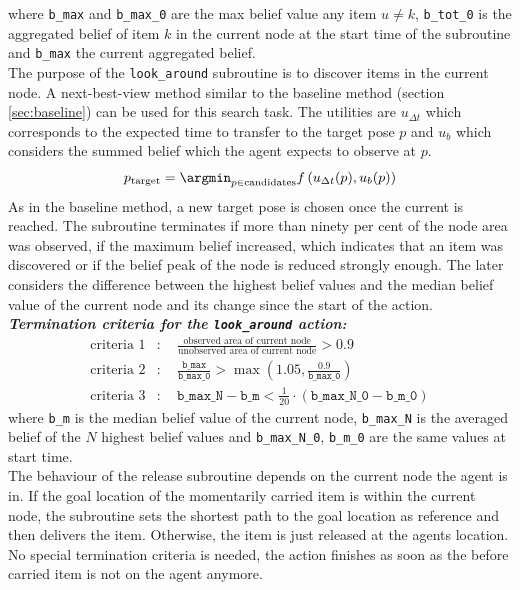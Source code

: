 where \texttt{b\_max} and \texttt{b\_max\_0} are the max belief value any item $u\neq k$, \texttt{b\_tot\_0} is the aggregated belief of item $k$ in the current node at the start time of the subroutine and \texttt{b\_max} the current aggregated belief.\\

The purpose of the \texttt{look\_around} subroutine is to discover items in the current node. A next-best-view method similar to the baseline method (section \ref{sec:baseline}) can be used for this search task. The utilities are $u_{\Delta t}$ which corresponds to the expected time to transfer to the target pose $p$ and $u_b$  which considers the summed belief which the agent expects to observe at $p$.
\begin{equation}
p_\text{target} = \argmin_{p\in \text{candidates}} f\left(u_{\Delta t}(p), u_b(p)\right)
\end{equation}
As in the baseline method, a new target pose is chosen once the current is reached. The subroutine terminates if more than ninety per cent of the node area was observed, if the maximum belief increased, which indicates that an item was discovered or if the belief peak of the node is reduced strongly enough. The later considers the difference between the highest belief values and the median belief value of the current node and its change since the start of the action. \\
\textit{\textbf{Termination criteria for the \texttt{look\_around} action:}}
\begin{align}
    \text{criteria 1}&: \quad \frac{\text{observed area of current node}}{\text{unobserved area of current node}} > 0.9\\
    \text{criteria 2}&: \quad \frac{\texttt{b\_max}}{\texttt{b\_max\_0}} > \max\left(1.05, \frac{0.9}{\texttt{b\_max\_0}}\right)\\
    \text{criteria 3}&: \quad  \texttt{b\_max\_N} - \texttt{b\_m} < \frac{1}{20}\cdot (\texttt{b\_max\_N\_0} - \texttt{b\_m\_0})
\end{align}
where \texttt{b\_m} is the median belief value of the current node, \texttt{b\_max\_N} is the averaged belief of the $N$ highest belief values and \texttt{b\_max\_N\_0}, \texttt{b\_m\_0} are the same values at start time.\\

The behaviour of the release subroutine depends on the current node the agent is in. If the goal location of the momentarily carried item is within the current node, the subroutine sets the shortest path to the goal location as reference and then delivers the item. Otherwise, the item is just released at the agents location. No special termination criteria is needed, the action finishes as soon as the before carried item is not on the agent anymore. 
